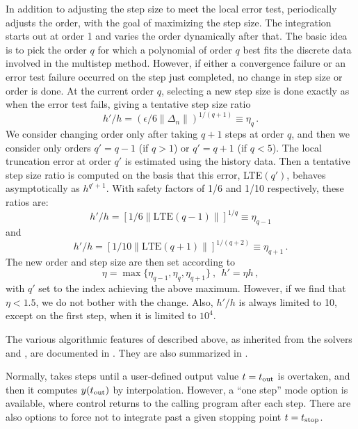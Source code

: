 In addition to adjusting the step size to meet the local error test,
{\cvode} periodically adjusts the order, with the goal of maximizing the
step size.  The integration starts out at order 1 and varies the order
dynamically after that.  The basic idea is to pick the order $q$ for
which a polynomial of order $q$ best fits the discrete data involved
in the multistep method.  However, if either a convergence failure or
an error test failure occurred on the step just completed, no change
in step size or order is done.  At the current order $q$, selecting a
new step size is done exactly as when the error test fails, giving a
tentative step size ratio
\[ h'/h = (\epsilon / 6 \|\Delta_n\| )^{1/(q+1)} \equiv \eta_q \, . \]
We consider changing order only after taking $q+1$ steps at order $q$,
and then we consider only orders $q' = q - 1$ (if $q > 1$) or
$q' = q + 1$ (if $q < 5$).  The local truncation error at order $q'$
is estimated using the history data.  Then a tentative step size ratio
is computed on the basis that this error, LTE$(q')$, behaves
asymptotically as $h^{q'+1}$.  With safety factors of 1/6 and
1/10 respectively, these ratios are:
\[ h'/h = [1 / 6 \|\mbox{LTE}(q-1)\| ]^{1/q} \equiv \eta_{q-1} \]
and
\[ h'/h = [1 / 10 \|\mbox{LTE}(q+1)\| ]^{1/(q+2)} \equiv \eta_{q+1} \, . \]
The new order and step size are then set according to
\[ \eta = \max\{\eta_{q-1},\eta_q,\eta_{q+1}\} ~,~~ h' = \eta h \, , \]
with $q'$ set to the index achieving the above maximum.
However, if we find that $\eta < 1.5$, we do not bother with the
change.  Also, $h'/h$ is always limited to 10, except on the first
step, when it is limited to $10^4$.

The various algorithmic features of {\cvode} described above, as
inherited from the solvers {\vode} and {\vodpk}, are documented in 
\cite{BBH:89,Byr:92,Hin:00}.  They are also summarized in
\cite{HBGLSSW:05}.

Normally, {\cvode} takes steps until a user-defined output value 
$t = t_{\mbox{\scriptsize out}}$ is overtaken, and then it computes
$y(t_{\mbox{\scriptsize out}})$ by interpolation.  However, a
``one step'' mode option is available, where control returns to the
calling program after each step.  There are also options to force
{\cvode} not to integrate past a given stopping point 
$t = t_{\mbox{\scriptsize stop}}$.

